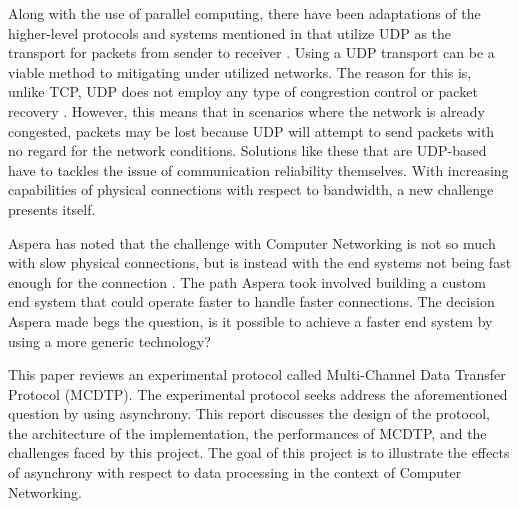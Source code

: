 Along with the use of parallel computing, there have been adaptations of the higher-level protocols and systems mentioned in \cite{Fan2010} that utilize UDP as the transport for packets from sender to receiver \cite{He2002}\cite{Fan2010}\cite{Aspera2016}\cite{Meiss2007}\cite{gu2007udt}. Using a UDP transport can be a viable method to mitigating under utilized networks. The reason for this is, unlike TCP, UDP does not employ any type of congrestion control or packet recovery \cite{postel1980user}. However, this means that in scenarios where the network is already congested, packets may be lost because UDP will attempt to send packets with no regard for the network conditions. Solutions like these that are UDP-based have to tackles the issue of communication reliability themselves. With increasing capabilities of physical connections with respect to bandwidth, a new challenge presents itself.

Aspera has noted that the challenge with Computer Networking is not so much with slow physical connections, but is instead with the end systems not being fast enough for the connection \cite{Fan2010}\cite{Aspera2016}. The path Aspera took involved building a custom end system that could operate faster to handle faster connections. The decision Aspera made begs the question, is it possible to achieve a faster end system by using a more generic technology?

This paper reviews an experimental protocol called Multi-Channel Data Transfer Protocol (MCDTP). The experimental protocol seeks address the aforementioned question by using asynchrony. This report discusses the design of the protocol, the architecture of the implementation, the performances of MCDTP, and the challenges faced by this project. The goal of this project is to illustrate the effects of asynchrony with respect to data processing in the context of Computer Networking.
